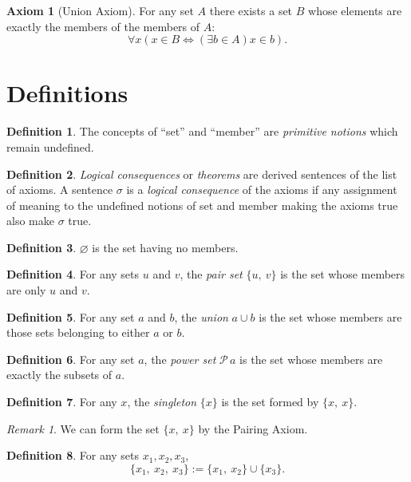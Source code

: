 \documentclass[12pt]{article}
\theoremstyle{plain}
\theoremstyle{remark}
\theoremstyle{definition}
\newtheorem{axiom}{Axiom}[section]
\newtheorem{defn}{Definition}[section]
\theoremstyle{remark}
\newtheorem*{remark}{Remark}
\newcommand{\powerset}{\mathscr{P}\,}
\begin{document}
\begin{axiom}[Union Axiom]
 For any set $A$ there exists a set $B$ whose elements are exactly the members of the members of $A$:
 \[
  \forall x(x \in B \Leftrightarrow (\exists b \in A) x \in b).
 \]
\end{axiom}


\section{Definitions}
\begin{defn}
 The concepts of ``set'' and ``member'' are \textit{primitive notions} which remain undefined.
\end{defn}

\begin{defn}
 \textit{Logical consequences} or \textit{theorems} are derived sentences of the list of axioms. A sentence $\sigma$ is a \textit{logical consequence} of the axioms if any assignment of meaning to the undefined notions of set and member making the axioms true also make $\sigma$ true.
\end{defn}

\begin{defn}\label{emptyset}
 $\varnothing$ is the set having no members.
\end{defn}

\begin{defn} For any sets $u$ and $v$, the \textit{pair set} $\{u,\ v\}$ is the set whose members are only $u$ and $v$.
\end{defn}

\begin{defn}
 For any set $a$ and $b$, the \textit{union} $a \cup b$ is the set whose members are those sets belonging to either $a$ or $b$.
\end{defn}

\begin{defn}
 For any set $a$, the \textit{power set} $\powerset a$ is the set whose members are exactly the subsets of $a$.
\end{defn}

\begin{defn}
 For any $x$, the \textit{singleton} $\{x\}$ is the set formed by $\{x,\ x\}$.
 \begin{remark}
  We can form the set $\{x,\ x\}$ by the Pairing Axiom.
 \end{remark}
\end{defn}

\begin{defn}
 For any sets $x_1, x_2, x_3$,
 \[
  \{x_1,\ x_2,\ x_3\} := \{x_1,\ x_2\} \cup \{x_3\}.
 \]
\end{defn}
\end{document}
